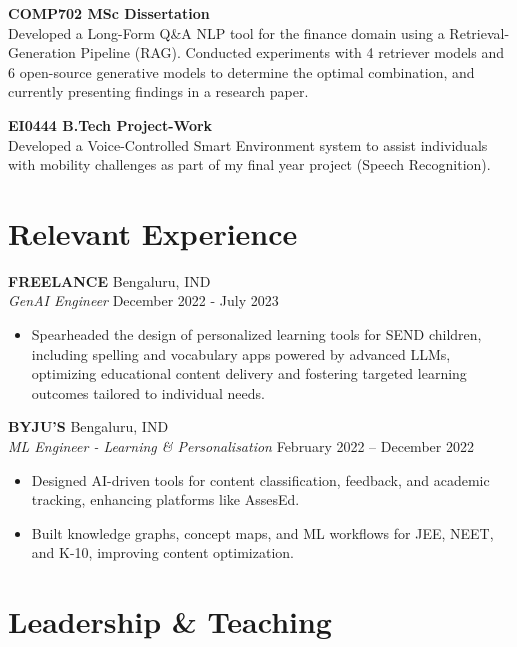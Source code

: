 \documentclass[a4paper,9pt]{article} %
\begin{document}
\textbf{COMP702 MSc Dissertation} \\
Developed a Long-Form Q\&A NLP tool for the finance domain using a Retrieval-Generation Pipeline (RAG). Conducted experiments with 4 retriever models and 6 open-source generative models to determine the optimal combination, and currently presenting findings in a research paper.

\vspace{0.1cm}

\textbf{EI0444 B.Tech Project-Work} \\
Developed a Voice-Controlled Smart Environment system to assist individuals with mobility challenges as part of my final year project (Speech Recognition). 

\section*{Relevant Experience}

\vspace{0.1cm}

\textbf{FREELANCE} \hfill Bengaluru, IND \\
\textit{GenAI Engineer} \hfill December 2022 - July 2023
\begin{itemize}[left=0pt, itemsep=0pt]
\item Spearheaded the design of personalized learning tools for SEND children, including spelling and vocabulary apps powered by advanced LLMs, optimizing educational content delivery and fostering targeted learning outcomes tailored to individual needs.

\end{itemize}

\vspace{0.1cm}

\textbf{BYJU'S} \hfill Bengaluru, IND \\
\textit{ML Engineer -  Learning \& Personalisation} \hfill February 2022 – December 2022
\begin{itemize}[left=0pt, itemsep=0pt]
    \item Designed AI-driven tools for content classification, feedback, and academic tracking, enhancing platforms like AssesEd.
    \item Built knowledge graphs, concept maps, and ML workflows for JEE, NEET, and K-10, improving content optimization.
\end{itemize}

\section*{Leadership \& Teaching}
\end{document}
